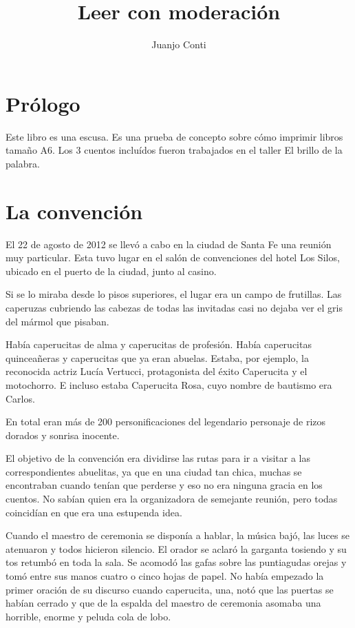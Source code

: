 \documentclass[11pt,twoside,openright,a6paper]{book}
\title{Leer con moderación}
\author{Juanjo Conti}
\date{}
\begin{document}
\pagestyle{plain}

\maketitle

\tableofcontents

\chapter*{Prólogo}

Este libro es una escusa. Es una prueba de concepto sobre cómo imprimir libros tamaño A6. Los 3 cuentos incluídos fueron trabajados en el
taller El brillo de la palabra.

\chapter*{La convención}

El 22 de agosto de 2012 se llevó a cabo en la ciudad de Santa Fe una reunión muy particular. Esta tuvo lugar en el salón de convenciones del hotel Los Silos, ubicado en el puerto de la ciudad, junto al casino.

Si se lo miraba desde lo pisos superiores, el lugar era un campo de frutillas. Las caperuzas cubriendo las cabezas de todas las invitadas casi no dejaba ver el gris del mármol que pisaban.

Había caperucitas de alma y caperucitas de profesión. Había caperucitas quinceañeras y caperucitas que ya eran abuelas.
Estaba, por ejemplo, la reconocida actriz Lucía Vertucci, protagonista del éxito Caperucita y el motochorro. E incluso estaba Caperucita Rosa, cuyo nombre de bautismo era Carlos.

En total eran más de 200 personificaciones del legendario personaje de rizos dorados y sonrisa inocente.

El objetivo de la convención era dividirse las rutas para ir a visitar a las correspondientes abuelitas, ya que en una ciudad tan chica, muchas se encontraban cuando tenían que perderse y eso no era ninguna gracia en los cuentos. No sabían quien era la organizadora de semejante reunión, pero todas coincidían en que era una estupenda idea.

Cuando el maestro de ceremonia se disponía a hablar, la música bajó, las luces se atenuaron y todos hicieron silencio. El orador se aclaró la garganta tosiendo y su tos retumbó en toda la sala. Se acomodó las gafas sobre las puntiagudas orejas y tomó entre sus manos cuatro o cinco hojas de papel. No había empezado la primer oración de su discurso cuando caperucita, una, notó que las puertas se habían cerrado y que de la espalda del maestro de ceremonia asomaba una horrible, enorme y peluda cola de lobo.
\end{document}
